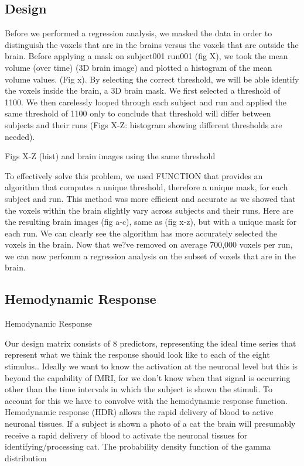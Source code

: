 \documentclass[11pt]{article}
\begin{document}
\subsection{Design}
Before we performed a regression analysis, we masked the data in order to distinguish the voxels that are in the brains versus the voxels that are outside the brain. Before applying a mask on subject001 run001 (fig X), we took the mean volume (over time) (3D brain image) and plotted a histogram of the mean volume values. (Fig x). By selecting the correct threshold, we will be able identify the voxels inside the brain, a 3D brain mask. We first selected a threshold of 1100. We then carelessly looped through each subject and run and applied the same threshold of 1100 only to conclude that threshold will differ between subjects and their runs (Figs X-Z: histogram showing different thresholds are needed). 

                                                  Figs X-Z (hist)
                                                   and brain images using the same threshold

To effectively solve this problem, we used FUNCTION that provides an algorithm that computes a unique threshold, therefore a unique mask, for each subject and run. This method was more efficient and accurate as we showed that the voxels within the brain slightly vary  across subjects and their runs. Here are the resulting brain images (fig a-c), same as (fig x-z), but with a unique mask for each run. We can clearly see the algorithm has  more accurately selected the voxels in the brain. Now that we?ve removed on average 700,000 voxels per run, we can now perfomm a regression analysis on the subset of voxels that are in the brain.              
\subsection{Hemodynamic Response}
Hemodynamic Response

Our design matrix consists of 8 predictors, representing the ideal time series that represent what we think the response should look like to each of the eight stimulus.. Ideally we want to know the activation at the neuronal level but this is beyond the capability of fMRI, for we don’t know when that signal is occurring other than the time intervals in which the subject is shown the stimuli. To account for this we have to convolve with the hemodynamic response function. Hemodynamic response (HDR) allows the rapid delivery of blood to active neuronal tissues. If a subject is shown a photo of a cat the brain will presumably receive a rapid delivery of blood to activate the neuronal tissues for identifying/processing cat. The probability density function of the gamma distribution
	
\end{document}
